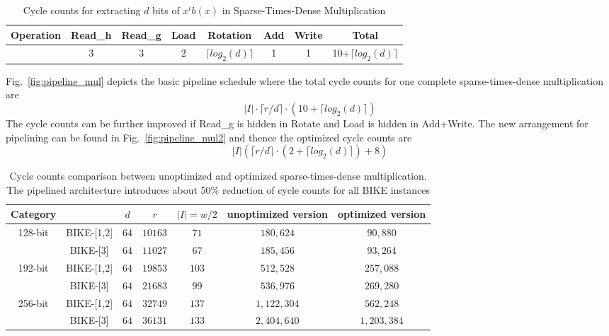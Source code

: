 \documentclass[runningheads]{llncs}
\begin{document}
\begin{table}[!tb]\centering
\caption{Cycle counts for extracting $d$ bits of $x^ib(x)$ in Sparse-Times-Dense Multiplication}
\begin{tabular}{c|c|c|c|c|c|c|c}
  \hline
  Operation & Read\_h & Read\_g & Load &Rotation & Add & Write & Total \\\hline
   & 3 & 3 & 2 & $\lceil log_2(d)\rceil$ & 1 & 1& 10+$\lceil log_2(d)\rceil$ \\
  \hline
\end{tabular}
\end{table}

Fig.~\ref{fig:pipeline_mul} depicts the basic pipeline schedule where the total cycle counts for one complete sparse-times-dense multiplication are
\[
    |I|\cdot\lceil r/d\rceil\cdot (10+\lceil log_2(d)\rceil)
\]
The cycle counts can be further improved if Read\_g is hidden in Rotate and Load is hidden in Add+Write. The new arrangement for pipelining  can be found in Fig.~\ref{fig:pipeline_mul2} and thence the optimized cycle counts are
\[
    |I|(\lceil r/d\rceil\cdot (2+\lceil log_2(d)\rceil) + 8)
\]

\begin{table}[!tb]\centering
\caption{Cycle counts comparison between unoptimized and optimized sparse-times-dense multiplication. The pipelined architecture introduces about 50\% reduction of cycle counts for all BIKE instances}
\begin{tabular}{cc|ccccc}
  \hline
 \textbf{Category}        &             & $d$ & $r$  & $|I|=w/2$  & unoptimized version& optimized version\\\hline
\multirow{ 2}{*}{128-bit} &  BIKE-[1,2] & $64$ & $10163$  & $71$  & $180,624$ & $90,880$\\
                          &  BIKE-[3] & $64$ & $11027$  & $67$  & $185,456$& $93,264$\\
  \hline
\multirow{ 2}{*}{192-bit} &  BIKE-[1,2] & $64$ & $19853$  & $103$  &$512,528$& $257,088$\\
                          &  BIKE-[3] & $64$ & $21683$  & $99$  &$536,976$& $269,280$\\
  \hline
\multirow{ 2}{*}{256-bit} &  BIKE-[1,2] & $64$ & $32749$  & $137$  &$1,122,304$& $562,248$\\
                          &  BIKE-[3] & $64$ & $36131$  & $133$  &$2,404,640$& $1,203,384$\\
  \hline
\end{tabular}
\end{table}
\end{document}

